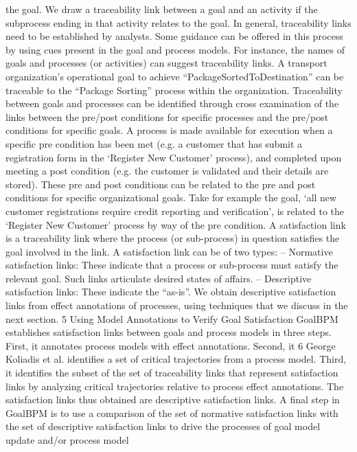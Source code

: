the goal. We draw a traceability link between a goal and an activity if the subprocess ending in that activity relates to the goal. In general, traceability links
need to be established by analysts. Some guidance can be offered in this process
by using cues present in the goal and process models. For instance, the names
of goals and processes (or activities) can suggest traceability links. A transport
organization’s operational goal to achieve “PackageSortedToDestination” can be
traceable to the “Package Sorting” process within the organization.
Traceability between goals and processes can be identified through cross examination of the links between the pre/post conditions for specific processes
and the pre/post conditions for specific goals. A process is made available for
execution when a specific pre condition has been met (e.g. a customer that has
submit a registration form in the ‘Register New Customer’ process), and completed upon meeting a post condition (e.g. the customer is validated and their
details are stored). These pre and post conditions can be related to the pre and
post conditions for specific organizational goals. Take for example the goal, ‘all
new customer registrations require credit reporting and verification’, is related
to the ‘Register New Customer’ process by way of the pre condition.
A satisfaction link is a traceability link where the process (or sub-process) in
question satisfies the goal involved in the link. A satisfaction link can be of two
types:
– Normative satisfaction links: These indicate that a process or sub-process
must satisfy the relevant goal. Such links articulate desired states of affairs.
– Descriptive satisfaction links: These indicate the “as-is”. We obtain descriptive satisfaction links from effect annotations of processes, using techniques
that we discuss in the next section.
5 Using Model Annotations to Verify Goal Satisfaction
GoalBPM establishes satisfaction links between goals and process models in
three steps. First, it annotates process models with effect annotations. Second, it
6 George Koliadis et al.
identifies a set of critical trajectories from a process model. Third, it identifies the
subset of the set of traceability links that represent satisfaction links by analyzing
critical trajectories relative to process effect annotations. The satisfaction links
thus obtained are descriptive satisfaction links. A final step in GoalBPM is to use
a comparison of the set of normative satisfaction links with the set of descriptive
satisfaction links to drive the processes of goal model update and/or process model
